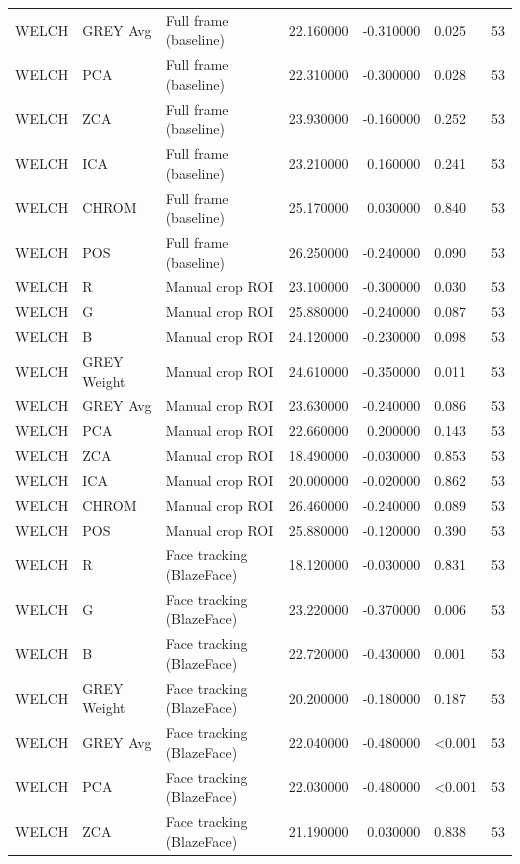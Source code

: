 \begin{table}[htbp]
\begin{tabular}{l l l r r l r}
WELCH & GREY Avg & Full frame (baseline) & 22.160000 & -0.310000 & 0.025 & 53 \\
WELCH & PCA & Full frame (baseline) & 22.310000 & -0.300000 & 0.028 & 53 \\
WELCH & ZCA & Full frame (baseline) & 23.930000 & -0.160000 & 0.252 & 53 \\
WELCH & ICA & Full frame (baseline) & 23.210000 & 0.160000 & 0.241 & 53 \\
WELCH & CHROM & Full frame (baseline) & 25.170000 & 0.030000 & 0.840 & 53 \\
WELCH & POS & Full frame (baseline) & 26.250000 & -0.240000 & 0.090 & 53 \\
WELCH & R & Manual crop ROI & 23.100000 & -0.300000 & 0.030 & 53 \\
WELCH & G & Manual crop ROI & 25.880000 & -0.240000 & 0.087 & 53 \\
WELCH & B & Manual crop ROI & 24.120000 & -0.230000 & 0.098 & 53 \\
WELCH & GREY Weight & Manual crop ROI & 24.610000 & -0.350000 & 0.011 & 53 \\
WELCH & GREY Avg & Manual crop ROI & 23.630000 & -0.240000 & 0.086 & 53 \\
WELCH & PCA & Manual crop ROI & 22.660000 & 0.200000 & 0.143 & 53 \\
WELCH & ZCA & Manual crop ROI & 18.490000 & -0.030000 & 0.853 & 53 \\
WELCH & ICA & Manual crop ROI & 20.000000 & -0.020000 & 0.862 & 53 \\
WELCH & CHROM & Manual crop ROI & 26.460000 & -0.240000 & 0.089 & 53 \\
WELCH & POS & Manual crop ROI & 25.880000 & -0.120000 & 0.390 & 53 \\
WELCH & R & Face tracking (BlazeFace) & 18.120000 & -0.030000 & 0.831 & 53 \\
WELCH & G & Face tracking (BlazeFace) & 23.220000 & -0.370000 & 0.006 & 53 \\
WELCH & B & Face tracking (BlazeFace) & 22.720000 & -0.430000 & 0.001 & 53 \\
WELCH & GREY Weight & Face tracking (BlazeFace) & 20.200000 & -0.180000 & 0.187 & 53 \\
WELCH & GREY Avg & Face tracking (BlazeFace) & 22.040000 & -0.480000 & <0.001 & 53 \\
WELCH & PCA & Face tracking (BlazeFace) & 22.030000 & -0.480000 & <0.001 & 53 \\
WELCH & ZCA & Face tracking (BlazeFace) & 21.190000 & 0.030000 & 0.838 & 53 \\

\end{tabular}
\end{table}
